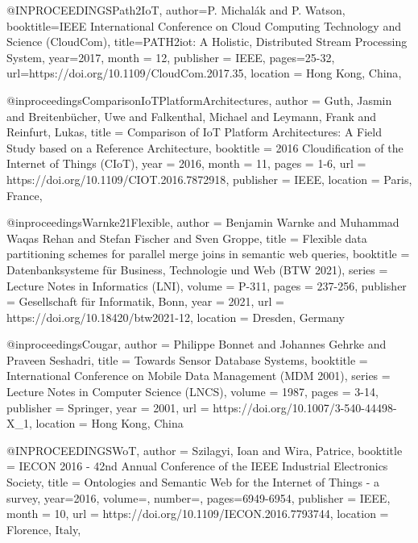 \documentclass[english,version-2019-11]{uzl-thesis}
\begin{document}
\begin{bibtex-entries}
@INPROCEEDINGS{Path2IoT,
    author={P. {Michalák} and P. {Watson}},
    booktitle={IEEE International Conference on Cloud Computing Technology and Science (CloudCom)},
    title={PATH2iot: A Holistic, Distributed Stream Processing System},
    year={2017},
    month = {12},
    publisher = {IEEE},
    pages={25-32},
    url={https://doi.org/10.1109/CloudCom.2017.35},
    location = {Hong Kong, China},
}

@inproceedings{ComparisonIoTPlatformArchitectures,
    author = {Guth, Jasmin and Breitenb{\"u}cher, Uwe and Falkenthal, Michael
    and Leymann, Frank and Reinfurt, Lukas},
    title = {Comparison of IoT Platform Architectures: A Field Study based on
    a Reference Architecture},
    booktitle = {2016 Cloudification of the Internet of Things (CIoT)},
    year = {2016},
    month = {11},
    pages = {1-6},
    url = {https://doi.org/10.1109/CIOT.2016.7872918},
    publisher = {IEEE},
    location = {Paris, France},
}

@inproceedings{Warnke21Flexible,
  author    = {Benjamin Warnke and Muhammad Waqas Rehan and Stefan Fischer and Sven Groppe},
  title     = {Flexible data partitioning schemes for parallel merge joins in semantic web queries},
  booktitle = {Datenbanksysteme f{\"u}r Business, Technologie und Web (BTW 2021)},
  series    = {Lecture Notes in Informatics (LNI)},
  volume    = {{P-311}},
  pages     = {237-256},
  publisher = {Gesellschaft f{\"u}r Informatik, Bonn},
  year      = {2021},
  url       = {https://doi.org/10.18420/btw2021-12},
  location =  {Dresden, Germany}
}

@inproceedings{Cougar,
  author    = {Philippe Bonnet and Johannes Gehrke and Praveen Seshadri},
  title     = {Towards Sensor Database Systems},
  booktitle = {International Conference on Mobile Data Management (MDM 2001)},
  series    = {Lecture Notes in Computer Science (LNCS)},
  volume    = {1987},
  pages     = {3-14},
  publisher = {Springer},
  year      = {2001},
  url       = {https://doi.org/10.1007/3-540-44498-X_1},
  location =  {Hong Kong, China}
}


@INPROCEEDINGS{WoT,
    author  = {Szilagyi, Ioan and Wira, Patrice},
    booktitle = {IECON 2016 - 42nd Annual Conference of the IEEE Industrial Electronics Society},
    title = {Ontologies and Semantic Web for the Internet of Things - a survey},
    year={2016},
    volume={},
    number={},
    pages={6949-6954},
    publisher     = {IEEE},
    month = {10},
    url = {https://doi.org/10.1109/IECON.2016.7793744},
    location =  {Florence, Italy},
}


\end{bibtex-entries}
\end{document}
